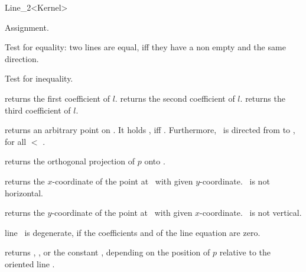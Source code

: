 \begin{ccRefClass} {Line_2<Kernel>}

\ccHidden {}
        {Assignment.}

       {Test for equality: two lines are equal, iff they have a non 
        empty  and the same direction.}

       {Test for inequality.}


       {returns the first coefficient of $l$.}
\ccGlue
{}
       {returns the second coefficient of $l$.}
\ccGlue
{}
       {returns the third coefficient of $l$.}

       {returns an arbitrary point on \ccVar. It holds 
        , iff .
        Furthermore, \ccVar\ is directed from 
        to , for all  $<$ .}

       {returns the orthogonal projection of $p$ onto \ccVar.}

       {returns the $x$-coordinate of the point at \ccVar\ with
        given $y$-coordinate.
        \ccPrecond \ccVar\ is not horizontal.}

       {returns the $y$-coordinate of the point at \ccVar\ with
        given $x$-coordinate.
        \ccPrecond \ccVar\ is not vertical.}


       {line \ccVar\ is degenerate, if the coefficients  and 
         of the line equation are zero.}

       {}
\ccGlue
{}
       {}

       {returns ,
        , or the constant
        ,
        depending on the position of $p$  relative to the oriented line \ccVar.
        }



\end{ccRefClass}
